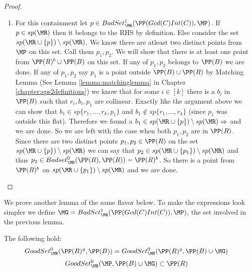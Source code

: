 \begin{proof}
\begin{enumerate}
 
 \item For this containment let $p\in BadSet^1_{\MR}(\PP(Gcd(C)Int(C)),\MP)$. If $p\in sp(\MR)$ then it belongs to
 the RHS by definition. Else consider the set $sp(\MR\cup\{p\})\setminus sp(\MR)$. We know there are atleast two distinct points
 from $\MP$ on this set. Call them $p_1,p_2$. We will show that there is at least one point from $\PP(R)^b \cup \PP(B)$ on this set.
 If any of $p_1,p_2$ belongs to $\PP(B)$ we are done. If any of $p_1,p_2$ say $p_1$ is a point outside $\PP(B)\cup \PP(R)$
 by Matching Lemma (See Lemma \ref{lemma:matchinglemma} in Chapter \ref{chapter:sps2definitions}) we know that for some $i\in [k]$
 there is a $b_i$ in $\PP(B)$ such that $r_i,b_i,p_1$ are collinear. Exactly like the argument above we can show that
 $b_1 \in sp\{r_1,\ldots,r_k,p_1\}$ and $b_1\notin sp\{r_1,\ldots,r_k\}$ (since $p_1$ was outside this flat). Therefore
 we found a $b_1 \in sp(\MR\cup \{p\})\setminus sp(\MR) \Rightarrow$ and we are done. So we are left with the case when both 
 $p_1,p_2$ are in $\PP(R)$. Since there are two distinct points $p_1,p_2\in \PP(R)$ on the set $sp(\MR\cup\{p\})\setminus sp(\MR)$
 we can say that $p_2\in sp(\MR\cup\{p_1\})\setminus sp(\MR)$ and thus $p_2\in Badset^0_{\MR}(\PP(R),\PP(R)) = \PP(R)^b$. So
 there is a point from $\PP(R)^b$ on $sp(\MR\cup \{p_1\})\setminus sp(\MR)$ and we are done.
\end{enumerate}

 

\end{proof}




We prove another lemma of the same flavor below. To make the expressions look simpler we define 
$\MG = BadSet^1_{\MR}(\PP(Gcd(C)Int(C)),\MP)$, the set involved in the previous lemma.
\begin{lemma}\label{lemma:overestimatedetector}
 The following hold:
 \begin{equation}\label{equation:largesizeredpoints}
  GoodSet^0_\MR(\PP(R)^g, \PP(B)) = GoodSet^0_\MR(\PP(R)^g,\PP(B)\cup \MG)
 \end{equation}
 \begin{equation}\label{equation:overestimate}
  GoodSet^0_\MR(\MP,\PP(B)\cup \MG) \subset \PP(R)
 \end{equation}
\end{lemma}

